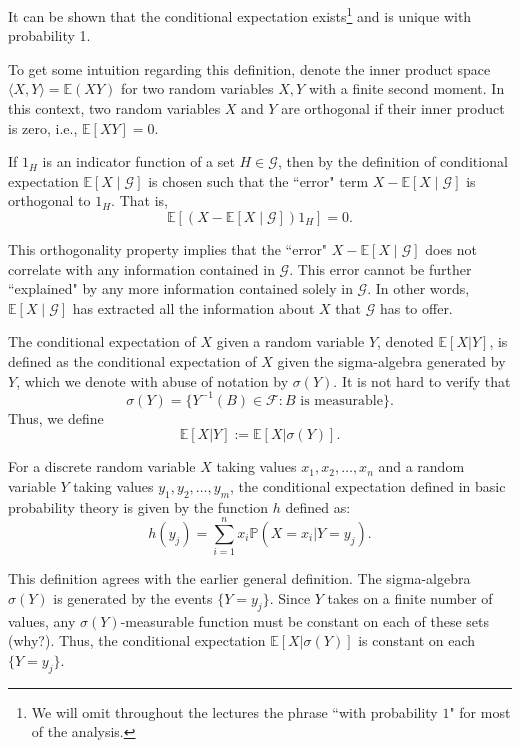 \documentclass[letter,11pt]{article}
\begin{document}
It can be shown that the conditional expectation exists\footnote{We will omit throughout the lectures the phrase ``with probability $1$" for most of the analysis.}  and is unique with probability 1.

To get some intuition regarding this definition, denote the inner product space $\langle X,Y \rangle = \mathbb{E}(XY)$ for two random variables $X,Y$ with a finite second moment. 
In this context, two random variables \( X \) and \( Y \) are orthogonal if their inner product is zero, i.e., \( \mathbb{E}[XY] = 0 \).





If \( 1_H \) is an indicator function of a set \( H \in \mathcal{G} \), then by the definition of conditional expectation  \( \mathbb{E}[X \mid \mathcal{G}] \) is chosen such that the ``error" term \( X - \mathbb{E}[X \mid \mathcal{G}] \) is orthogonal to \( 1_H \). That is, 
\[
\mathbb{E}[(X - \mathbb{E}[X \mid \mathcal{G}])1_H] = 0.
\]


This orthogonality property implies that the ``error" \( X - \mathbb{E}[X \mid \mathcal{G}] \) does not correlate with any information contained in \( \mathcal{G} \). This error cannot be further ``explained" by any more information contained solely in \( \mathcal{G} \). In other words, \( \mathbb{E}[X \mid \mathcal{G}] \) has extracted all the information about \( X \) that \( \mathcal{G} \) has to offer.



The conditional expectation of \( X \) given a random variable \( Y \), denoted \( \mathbb{E}[X | Y] \), is defined as the conditional expectation of \( X \) given the sigma-algebra generated by \( Y \), which we denote with abuse of notation by \( \sigma(Y) \). It is not hard to verify that $$\sigma(Y) = \{Y^{-1}(B) \in \mathcal{F}: B \text{ is measurable}\}.$$ 
Thus, we define
\[
\mathbb{E}[X | Y] := \mathbb{E}[X | \sigma(Y)].
\]

For a discrete random variable \( X \) taking values \( x_1, x_2, \ldots, x_n \) and a random variable \( Y \) taking values \( y_1, y_2, \ldots, y_m \), the conditional expectation defined in basic probability theory is given by the function \( h \) defined as:
\[
h(y_{j}) = \sum_{i=1}^n x_i \mathbb{P}(X = x_i | Y = y_j).
\]

This definition agrees with the earlier general definition. The sigma-algebra \( \sigma(Y) \) is generated by the events \( \{Y = y_j\} \). Since \( Y \) takes on a finite number of values, any \( \sigma(Y) \)-measurable function must be constant on each of these sets (why?). Thus, the conditional expectation \( \mathbb{E}[X | \sigma(Y)] \) is constant on each \( \{Y = y_j\} \).
\end{document}
